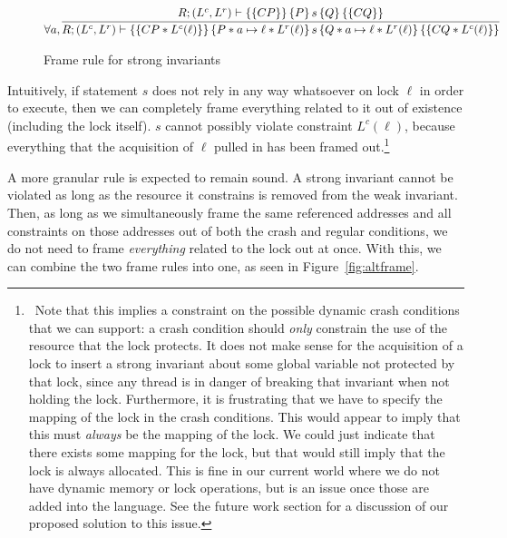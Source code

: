 \begin{figure*}
\begin{gather*}
    \forall a, \infer
	{\hoarestmt{R}{(L^c,L^r)}{CP * L^c(\ell)}{P * a \mapsto \ell * L^r(\ell)}{s}{Q * a \mapsto \ell * L^r(\ell)}{CQ * L^c(\ell)}}
	{\hoarestmt{R}{(L^c,L^r)}{CP}{P}{s}{Q}{CQ}}
\end{gather*}
\caption{Frame rule for strong invariants}
\label{fig:stronginv}
\end{figure*}

Intuitively, if statement $s$ does not rely in any way whatsoever on lock $\ell$
in order to execute, then we can completely frame everything related to it out
of existence (including the lock itself).
$s$ cannot possibly violate constraint
$L^c(\ell)$, because everything that the acquisition of $\ell$ pulled in has
been framed out.\footnote{\
Note that this implies a constraint on the possible
dynamic crash conditions that we can support: a crash condition should
\textit{only} constrain the use of the resource that the lock
protects.
It does
not make sense for the acquisition of a lock to insert a strong invariant about
some global variable not protected by that lock, since any thread is in danger
of breaking that invariant when not holding the lock.
Furthermore, it is
frustrating that we have to specify the mapping of the lock in the crash
conditions.
This would appear to imply that this must \textit{always} be the
mapping of the lock.
We could just indicate that there exists some mapping
for the lock, but that would still imply that the lock is always allocated.
This is fine in our current world where we do not have dynamic memory or lock
operations, but is an issue once those are added into the language.
See the
future work section for a discussion of our proposed solution to this issue.}

A more granular rule is expected to remain sound.
A strong invariant cannot be
violated as long as the resource it constrains is removed from the weak
invariant.
Then, as long as we simultaneously frame the same referenced
addresses and all constraints on those addresses out of both the crash and
regular conditions, we do not need to frame \textit{everything} related to the
lock out at once.
With this, we can combine the two frame rules into one, as
seen in Figure~\ref{fig:altframe}.



